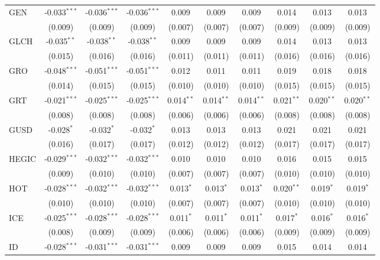 \begin{table}[!htbp]
\begin{tabular}{@{\extracolsep{5pt}}lccccccccc}
 GEN & -0.033$^{***}$ & -0.036$^{***}$ & -0.036$^{***}$ & 0.009$^{}$ & 0.009$^{}$ & 0.009$^{}$ & 0.014$^{}$ & 0.013$^{}$ & 0.013$^{}$ \\
  & (0.009) & (0.009) & (0.009) & (0.007) & (0.007) & (0.007) & (0.009) & (0.009) & (0.009) \\
 GLCH & -0.035$^{**}$ & -0.038$^{**}$ & -0.038$^{**}$ & 0.009$^{}$ & 0.009$^{}$ & 0.009$^{}$ & 0.014$^{}$ & 0.013$^{}$ & 0.013$^{}$ \\
  & (0.015) & (0.016) & (0.016) & (0.011) & (0.011) & (0.011) & (0.016) & (0.016) & (0.016) \\
 GRO & -0.048$^{***}$ & -0.051$^{***}$ & -0.051$^{***}$ & 0.012$^{}$ & 0.011$^{}$ & 0.011$^{}$ & 0.019$^{}$ & 0.018$^{}$ & 0.018$^{}$ \\
  & (0.014) & (0.015) & (0.015) & (0.010) & (0.010) & (0.010) & (0.015) & (0.015) & (0.015) \\
 GRT & -0.021$^{***}$ & -0.025$^{***}$ & -0.025$^{***}$ & 0.014$^{**}$ & 0.014$^{**}$ & 0.014$^{**}$ & 0.021$^{**}$ & 0.020$^{**}$ & 0.020$^{**}$ \\
  & (0.008) & (0.008) & (0.008) & (0.006) & (0.006) & (0.006) & (0.008) & (0.008) & (0.008) \\
 GUSD & -0.028$^{*}$ & -0.032$^{*}$ & -0.032$^{*}$ & 0.013$^{}$ & 0.013$^{}$ & 0.013$^{}$ & 0.021$^{}$ & 0.021$^{}$ & 0.021$^{}$ \\
  & (0.016) & (0.017) & (0.017) & (0.012) & (0.012) & (0.012) & (0.017) & (0.017) & (0.017) \\
 HEGIC & -0.029$^{***}$ & -0.032$^{***}$ & -0.032$^{***}$ & 0.010$^{}$ & 0.010$^{}$ & 0.010$^{}$ & 0.016$^{}$ & 0.015$^{}$ & 0.015$^{}$ \\
  & (0.009) & (0.010) & (0.010) & (0.007) & (0.007) & (0.007) & (0.010) & (0.010) & (0.010) \\
 HOT & -0.028$^{***}$ & -0.032$^{***}$ & -0.032$^{***}$ & 0.013$^{*}$ & 0.013$^{*}$ & 0.013$^{*}$ & 0.020$^{**}$ & 0.019$^{*}$ & 0.019$^{*}$ \\
  & (0.010) & (0.010) & (0.010) & (0.007) & (0.007) & (0.007) & (0.010) & (0.010) & (0.010) \\
 ICE & -0.025$^{***}$ & -0.028$^{***}$ & -0.028$^{***}$ & 0.011$^{*}$ & 0.011$^{*}$ & 0.011$^{*}$ & 0.017$^{*}$ & 0.016$^{*}$ & 0.016$^{*}$ \\
  & (0.008) & (0.009) & (0.009) & (0.006) & (0.006) & (0.006) & (0.009) & (0.009) & (0.009) \\
 ID & -0.028$^{***}$ & -0.031$^{***}$ & -0.031$^{***}$ & 0.009$^{}$ & 0.009$^{}$ & 0.009$^{}$ & 0.015$^{}$ & 0.014$^{}$ & 0.014$^{}$ \\

\end{tabular}
\end{table}
